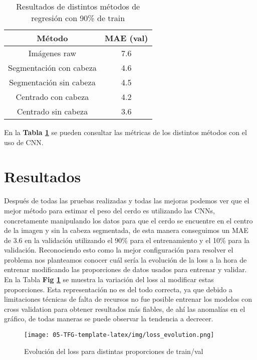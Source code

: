 ﻿\documentclass[10pt,a4paper,twocolumn,twoside]{article}
\begin{document}
\begin{table}[!]
 \centering
\begin{tabular}{|c|c|}
\hline
\textbf{Método}          & \textbf{MAE (val)} \\ \hline
Imágenes raw             & 7.6          \\ \hline
Segmentación con cabeza  & 4.6          \\ \hline
Segmentación sin cabeza  & 4.5          \\ \hline
Centrado con cabeza & 4.2          \\ \hline
Centrado sin cabeza & 3.6          \\ \hline
\end{tabular}
\caption{Resultados de distintos métodos de regresión con 90\% de train}
\label{resultados}
\end{table}
En la \textbf{Tabla \ref{resultados}} se pueden consultar las métricas de los distintos métodos con el uso de CNN.

\section{Resultados}

Después de todas las pruebas realizadas y todas las mejoras podemos ver que el mejor método para estimar el peso del cerdo es utilizando las CNNs, concretamente manipulando los datos para que el cerdo se encuentre en el centro de la imagen y sin la cabeza segmentada, de esta manera conseguimos un MAE\cite{mae} de 3.6 en la validación utilizando el 90\% para el entrenamiento y el 10\% para la validación.
Reconociendo esto como la mejor configuración para resolver el problema nos planteamos conocer cuál sería la evolución de la loss a la hora de entrenar modificando las proporciones de datos usados para entrenar y validar. En la Tabla \textbf{Fig \ref{loss}} se muestra la variación del loss al modificar estas proporciones. Esta representación no es del todo correcta, ya que debido a limitaciones técnicas de falta de recursos no fue posible entrenar los modelos con cross validation para obtener resultados más fiables, de ahí las anomalías en el gráfico, de todas maneras se puede observar la tendencia a decrecer.

    \begin{figure}
    \centering
    \texttt{[image: 05-TFG-template-latex/img/loss\_evolution.png]}
    \caption{Evolución del loss para distintas proporciones de train/val}
    \label{loss}
    \end{figure}
\end{document}
